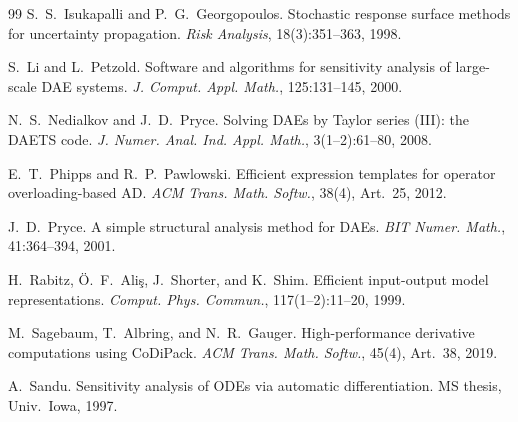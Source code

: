 \documentclass[12pt,a4paper]{article}
\theoremstyle{definition}
\theoremstyle{plain}
\theoremstyle{remark}
\begin{document}
\begin{thebibliography}{99}
S.\ S.\ Isukapalli and P.\ G.\ Georgopoulos.
Stochastic response surface methods for uncertainty propagation.
\textit{Risk Analysis}, 18(3):351--363, 1998.

S.\ Li and L.\ Petzold.
Software and algorithms for sensitivity analysis of large-scale DAE systems.
\textit{J. Comput. Appl. Math.}, 125:131--145, 2000.

N.\ S.\ Nedialkov and J.\ D.\ Pryce.
Solving DAEs by Taylor series (III): the DAETS code.
\textit{J. Numer. Anal. Ind. Appl. Math.}, 3(1--2):61--80, 2008.

E.\ T.\ Phipps and R.\ P.\ Pawlowski.
Efficient expression templates for operator overloading-based AD.
\textit{ACM Trans. Math. Softw.}, 38(4), Art.\ 25, 2012.

J.\ D.\ Pryce.
A simple structural analysis method for DAEs.
\textit{BIT Numer. Math.}, 41:364--394, 2001.

H.\ Rabitz, \"{O}.\ F.\ Ali\c{s}, J.\ Shorter, and K.\ Shim.
Efficient input-output model representations.
\textit{Comput. Phys. Commun.}, 117(1--2):11--20, 1999.

M.\ Sagebaum, T.\ Albring, and N.\ R.\ Gauger.
High-performance derivative computations using CoDiPack.
\textit{ACM Trans. Math. Softw.}, 45(4), Art.\ 38, 2019.

A.\ Sandu.
Sensitivity analysis of ODEs via automatic differentiation.
MS thesis, Univ.\ Iowa, 1997.

\end{thebibliography}
\end{document}

